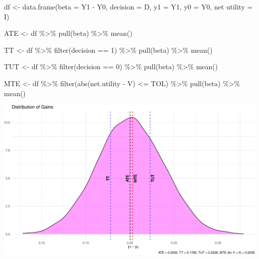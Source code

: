 \documentclass[9pt,twocolumn,twoside,]{pnas-new}
\newenvironment{Shaded}{}{}
\newcommand{\DecValTok}[1]{\textcolor[rgb]{0.25,0.63,0.44}{#1}}
\newcommand{\FunctionTok}[1]{\textcolor[rgb]{0.02,0.16,0.49}{#1}}
\newcommand{\NormalTok}[1]{#1}
\newcommand{\OtherTok}[1]{\textcolor[rgb]{0.00,0.44,0.13}{#1}}
\newcommand{\SpecialCharTok}[1]{\textcolor[rgb]{0.25,0.44,0.63}{#1}}
\newcommand{\StringTok}[1]{\textcolor[rgb]{0.25,0.44,0.63}{#1}}
\begin{document}
\begin{Shaded}
\begin{Highlighting}[]
\NormalTok{df }\OtherTok{\textless{}{-}} \FunctionTok{data.frame}\NormalTok{(}\StringTok{\textquotesingle{}beta\textquotesingle{}} \OtherTok{=}\NormalTok{ Y1 }\SpecialCharTok{{-}}\NormalTok{ Y0,}
                 \StringTok{\textquotesingle{}decision\textquotesingle{}} \OtherTok{=}\NormalTok{ D,}
                 \StringTok{\textquotesingle{}y1\textquotesingle{}} \OtherTok{=}\NormalTok{ Y1,}
                 \StringTok{\textquotesingle{}y0\textquotesingle{}} \OtherTok{=}\NormalTok{ Y0,}
                 \StringTok{\textquotesingle{}net utility\textquotesingle{}} \OtherTok{=}\NormalTok{ I)}

\NormalTok{ATE }\OtherTok{\textless{}{-}}\NormalTok{ df }\SpecialCharTok{\%\textgreater{}\%}
    \FunctionTok{pull}\NormalTok{(beta) }\SpecialCharTok{\%\textgreater{}\%} 
    \FunctionTok{mean}\NormalTok{()}

\NormalTok{TT }\OtherTok{\textless{}{-}}\NormalTok{ df }\SpecialCharTok{\%\textgreater{}\%}
    \FunctionTok{filter}\NormalTok{(decision }\SpecialCharTok{==} \DecValTok{1}\NormalTok{) }\SpecialCharTok{\%\textgreater{}\%}
    \FunctionTok{pull}\NormalTok{(beta) }\SpecialCharTok{\%\textgreater{}\%}
    \FunctionTok{mean}\NormalTok{()}

\NormalTok{TUT }\OtherTok{\textless{}{-}}\NormalTok{ df }\SpecialCharTok{\%\textgreater{}\%}
    \FunctionTok{filter}\NormalTok{(decision }\SpecialCharTok{==} \DecValTok{0}\NormalTok{) }\SpecialCharTok{\%\textgreater{}\%}
    \FunctionTok{pull}\NormalTok{(beta) }\SpecialCharTok{\%\textgreater{}\%}
    \FunctionTok{mean}\NormalTok{()}

\NormalTok{MTE }\OtherTok{\textless{}{-}}\NormalTok{ df }\SpecialCharTok{\%\textgreater{}\%}
    \FunctionTok{filter}\NormalTok{(}\FunctionTok{abs}\NormalTok{(net.utility }\SpecialCharTok{{-}}\NormalTok{ V) }\SpecialCharTok{\textless{}=}\NormalTok{ TOL) }\SpecialCharTok{\%\textgreater{}\%}
    \FunctionTok{pull}\NormalTok{(beta) }\SpecialCharTok{\%\textgreater{}\%}
    \FunctionTok{mean}\NormalTok{()}
\end{Highlighting}
\end{Shaded}

\begin{center}\includegraphics[width=0.85\linewidth,]{hw1_files/figure-latex/unnamed-chunk-2-1} \end{center}
\end{document}
